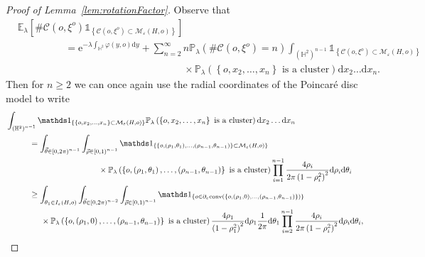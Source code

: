 \documentclass[10pt,a4paper,dvipsnames]{article}
\theoremstyle{definition}
\theoremstyle{remark}
\newcommand{\pla}{\mathbb P_\lambda}
\newcommand{\ela}{\mathbb E_{\lambda}}
\newcommand{\Mcal}{\mathcal{M}}
\newcommand{\HypTwo}{{\mathbb{H}^2}}
\newcommand{\dd}{\mathrm{d}} %
\newcommand{\C}{\mathscr {C}}
\newcommand{\convex}[1]{{\mathrm{conv}\left(#1\right)}}
\newcommand{\Id}{\mathds 1}
\newcommand{\orig}{o}
\newcommand{\e}{\mathrm{e}}
\newcommand{\connf}{\varphi}
\numberwithin{equation}{section}
\begin{document}
\begin{proof}[Proof of Lemma~\ref{lem:rotationFactor}]
    Observe that
    \begin{align}
        &\ela\left[\#\C\left(\orig,\xi^{\orig}\right)\Id_{\left\{\C\left(\orig,\xi^{\orig}\right)\subset\Mcal_\varepsilon\left(H,\orig\right)\right\}}\right] \nonumber\\
        &\hspace{2cm}=\e^{-\lambda\int_\HypTwo\connf(y,\orig)\dd y}+\sum_{n=2}^\infty n\pla\left(\#\C\left(\orig,\xi^\orig\right)=n\right)\int_{\left(\HypTwo\right)^{n-1}}\Id_{\left\{\C\left(\orig,\xi^{\orig}\right)\subset\Mcal_\varepsilon\left(H,\orig\right)\right\}}\nonumber\\
        &\hspace{7cm}\times\pla\left(\left\{\orig,x_2,\ldots,x_n\right\}\text{ is a cluster}\right)\dd x_2\ldots \dd x_n.
    \end{align}
    Then for $n\geq 2$ we can once again use the radial coordinates of the Poincar{\'e} disc model to write
    \begin{align}
        &\int_{\left(\HypTwo\right)^{n-1}}\Id_{\left\{\left\{\orig,x_2,\ldots,x_n\right\}\subset\Mcal_\varepsilon\left(H,\orig\right)\right\}}\pla\left(\left\{\orig,x_2,\ldots,x_n\right\}\text{ is a cluster}\right)\dd x_2\ldots \dd x_n\nonumber\\
        & \hspace{1cm}= \int_{\vec{\theta}\in\left[0,2\pi\right)^{n-1}}\int_{\vec{\rho}\in\left[0,1\right)^{n-1}} \Id_{\left\{\left\{\orig,\left(\rho_1,\theta_{1}\right),\ldots,\left(\rho_{n-1},\theta_{n-1}\right)\right\}\subset\Mcal_\varepsilon\left(H,\orig\right)\right\}}\nonumber\\
        &\hspace{4cm}\times\pla\left(\left\{\orig,\left(\rho_1,\theta_{1}\right),\ldots,\left(\rho_{n-1},\theta_{n-1}\right)\right\}\text{ is a cluster}\right)\prod^{n-1}_{i=1}\frac{4\rho_i}{2\pi\left(1-\rho_i^2\right)^2}\dd \rho_i\dd\theta_i\nonumber\\
        &\hspace{1cm}\geq \int_{\theta_1\in I_\varepsilon\left(H,\orig\right)}\int_{\vec{\theta}\in\left[0,2\pi\right)^{n-2}}\int_{\vec{\rho}\in\left[0,1\right)^{n-1}} \Id_{\left\{\orig\in\partial_{\varepsilon}\convex{\left\{\orig,\left(\rho_1,0\right),\ldots,\left(\rho_{n-1},\theta_{n-1}\right)\right\}}\right\}}\nonumber\\
        &\hspace{1.5cm}\times\pla\left(\left\{\orig,\left(\rho_1,0\right),\ldots,\left(\rho_{n-1},\theta_{n-1}\right)\right\}\text{ is a cluster}\right)\frac{4\rho_1}{\left(1-\rho_1^2\right)^2}\dd\rho_1\frac{1}{2\pi}\dd \theta_1\prod^{n-1}_{i=2}\frac{4\rho_i}{2\pi\left(1-\rho_i^2\right)^2}\dd \rho_i\dd\theta_i,

\end{align}
\end{proof}
\end{document}
